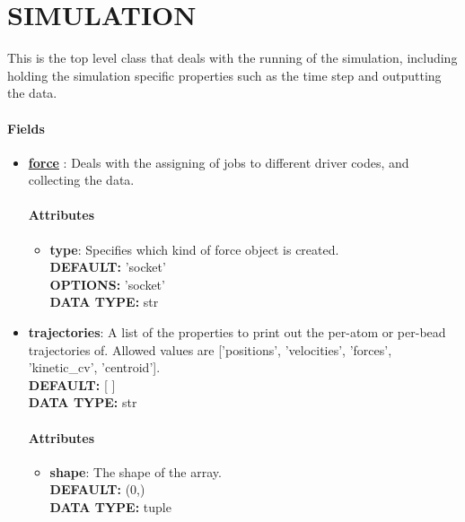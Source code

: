 \section{SIMULATION}
\label{SIMULATION}
This is the top level class that deals with the running of the simulation, including holding the simulation specific properties such as the time step and outputting the data.
\paragraph{Fields}
 \begin{itemize}
\item {\bf \hyperref[FORCES]{force} }:
 Deals with the assigning of jobs to different driver codes, and collecting the data.
\paragraph{Attributes}
 \begin{itemize}
\item {\bf type}:
 Specifies which kind of force object is created.
{\\ \bf DEFAULT: }'socket'
{\\ \bf OPTIONS: }'socket'
{\\ \bf DATA TYPE: }str
\end{itemize}
 
\item {\bf trajectories}:
 A list of the properties to print out the per-atom or per-bead trajectories of. Allowed values are ['positions', 'velocities', 'forces', 'kinetic\_cv', 'centroid'].
{\\ \bf DEFAULT: }[ ]
{\\ \bf DATA TYPE: }str
\paragraph{Attributes}
 \begin{itemize}
\item {\bf shape}:
 The shape of the array.
{\\ \bf DEFAULT: }(0,)
{\\ \bf DATA TYPE: }tuple
\end{itemize}
 

\end{itemize}
